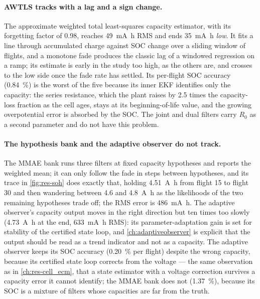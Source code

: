 \paragraph{AWTLS tracks with a lag and a sign change.} The approximate weighted total
least-squares capacity estimator, with its forgetting factor of \num{0.98}, reaches
\SI{49}{\milli\ampere\hour} RMS and ends \SI{35}{\milli\ampere\hour} \emph{low}. It fits a line
through accumulated charge against SOC change over a sliding window of flights, and a
monotone fade produces the classic lag of a windowed regression on a ramp; its estimate is
early in the study too high, as the others are, and crosses to the low side once the fade
rate has settled. Its per-flight SOC accuracy (\SI{0.84}{\percent}) is the worst of the five
because its inner EKF identifies only the capacity: the series resistance, which the plant
raises by \num{2.5} times the capacity-loss fraction as the cell ages, stays at its
beginning-of-life value, and the growing overpotential error is absorbed by the SOC. The joint
and dual filters carry $R_0$ as a second parameter and do not have this problem.

\paragraph{The hypothesis bank and the adaptive observer do not track.} The MMAE bank runs
three filters at fixed capacity hypotheses and reports the weighted mean; it can only follow
the fade in steps between hypotheses, and its trace in \cref{fig:res-soh} does exactly that,
holding \SI{4.51}{\ampere\hour} from flight 15 to flight 30 and then wandering between
\SI{4.6}{} and \SI{4.8}{\ampere\hour} as the likelihoods of the two remaining hypotheses trade
off; the RMS error is \SI{486}{\milli\ampere\hour}. The adaptive observer's capacity output
moves in the right direction but ten times too slowly (\SI{4.73}{\ampere\hour} at the end,
\SI{633}{\milli\ampere\hour} RMS): its parameter-adaptation gain is set for stability of the
certified state loop, and \cref{ch:adaptiveobserver} is explicit that the output should be read
as a trend indicator and not as a capacity. The adaptive observer keeps its SOC accuracy (\SI{0.20}{\percent} per flight) despite the
wrong capacity, because its certified state loop corrects from the voltage --- the same
observation as in \cref{ch:res-cell_ecm}, that a state estimator with a voltage correction
survives a capacity error it cannot identify; the MMAE bank does not (\SI{1.37}{\percent}),
because its SOC is a mixture of filters whose capacities are far from the truth.

